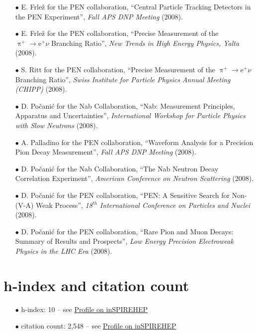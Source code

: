 \documentclass{article}[10pt]
\begin{document}
\begin{itemize}
\item [$\bullet$] E. Frle\v{z} for the PEN collaboration, ``Central Particle Tracking Detectors in the PEN Experiment'', \emph{Fall APS DNP Meeting} (2008).

\item [$\bullet$] E. Frle\v{z} for the PEN collaboration, ``Precise Measurement of the $\uppi^{+}\rightarrow\mathrm{e}^{+}\nu$ Branching Ratio'', \emph{New Trends in High Energy Physics, Yalta} (2008).

\item [$\bullet$] S. Ritt for the PEN collaboration, ``Precise Measurement of the $\uppi^{+}\rightarrow\mathrm{e}^{+}\nu$ Branching Ratio'', \emph{Swiss Institute for Particle Physics Annual Meeting (CHIPP)} (2008).

\item [$\bullet$] D. Po\v{c}ani\'c for the Nab Collaboration,  ``Nab: Measurement Principles, Apparatus and Uncertainties'',  \emph{International Workshop for Particle Physics with Slow Neutrons} (2008).

\item [$\bullet$] A. Palladino for the PEN collaboration, ``Waveform Analysis for a Precision Pion Decay Measurement'', \emph{Fall APS DNP Meeting} (2008).

\item [$\bullet$] D. Po\v{c}ani\'c for the Nab Collaboration, ``The Nab Neutron Decay Correlation Experiment'', \emph{American Conference on Neutron Scattering} (2008).

\item [$\bullet$] D. Po\v{c}ani\'c for the PEN collaboration, ``PEN: A Sensitive Search for Non-(V-A) Weak Process'', \emph{18$^{th}$ International Conference on Particles and Nuclei} (2008).

\item [$\bullet$] D. Po\v{c}ani\'c for the PEN collaboration, ``Rare Pion and Muon Decays: Summary of Results and Prospects'', \emph{Low Energy Precision Electroweak Physics in the LHC Era} (2008).
\end{itemize}

\section*{h-index and citation count}
\begin{itemize}
\item [$\bullet$] h-index: 10 -- see \href{https://inspirehep.net/authors/1191633}{Profile on inSPIREHEP}
\item [$\bullet$] citation count: 2,548 -- see \href{https://inspirehep.net/authors/1191633}{Profile on inSPIREHEP}
\end{itemize}
\end{document}
